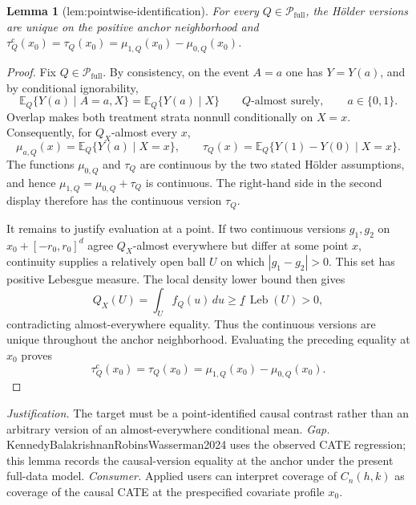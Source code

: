 \documentclass{article}
\newtheorem{lemma}{Lemma}
\begin{document}
\begin{lemma}[lem:pointwise-identification]\label{lem:pointwise-identification}
For every \(Q\in\mathcal P_{\mathrm{full}}\), the Hölder versions are unique on the positive anchor neighborhood and \(\tau_Q^{\mathrm c}(x_0)=\tau_Q(x_0)=\mu_{1,Q}(x_0)-\mu_{0,Q}(x_0)\).
\end{lemma}
\begin{proof}
Fix \(Q\in\mathcal P_{\mathrm{full}}\).  By consistency, on the event \(A=a\) one has \(Y=Y(a)\), and by conditional ignorability,
\[
 \mathbb E_Q\{Y(a)\mid A=a,X\}=\mathbb E_Q\{Y(a)\mid X\}
 \qquad Q\text{-almost surely},\qquad a\in\{0,1\}.
\]
Overlap makes both treatment strata nonnull conditionally on \(X=x\).  Consequently, for \(Q_X\)-almost every \(x\),
\[
 \mu_{a,Q}(x)=\mathbb E_Q\{Y(a)\mid X=x\},
 \qquad
 \tau_Q(x)=\mathbb E_Q\{Y(1)-Y(0)\mid X=x\}.
\]
The functions \(\mu_{0,Q}\) and \(\tau_Q\) are continuous by the two stated H\"older assumptions, and hence \(\mu_{1,Q}=\mu_{0,Q}+\tau_Q\) is continuous.  The right-hand side in the second display therefore has the continuous version \(\tau_Q\).

It remains to justify evaluation at a point.  If two continuous versions \(g_1,g_2\) on \(x_0+[-r_0,r_0]^d\) agree \(Q_X\)-almost everywhere but differ at some point \(x\), continuity supplies a relatively open ball \(U\) on which \(|g_1-g_2|>0\).  This set has positive Lebesgue measure.  The local density lower bound then gives
\[
 Q_X(U)=\int_U f_Q(u)\,du\ge \underline f\,\operatorname{Leb}(U)>0,
\]
contradicting almost-everywhere equality.  Thus the continuous versions are unique throughout the anchor neighborhood.  Evaluating the preceding equality at \(x_0\) proves
\[
 \tau_Q^{\mathrm c}(x_0)=\tau_Q(x_0)
 =\mu_{1,Q}(x_0)-\mu_{0,Q}(x_0).
\]
\end{proof}
\par\smallskip\noindent \textit{Justification.} The target must be a point-identified causal contrast rather than an arbitrary version of an almost-everywhere conditional mean. \textit{Gap.} KennedyBalakrishnanRobinsWasserman2024 uses the observed CATE regression; this lemma records the causal-version equality at the anchor under the present full-data model. \textit{Consumer.} Applied users can interpret coverage of \(C_n(h,k)\) as coverage of the causal CATE at the prespecified covariate profile \(x_0\).
\end{document}
